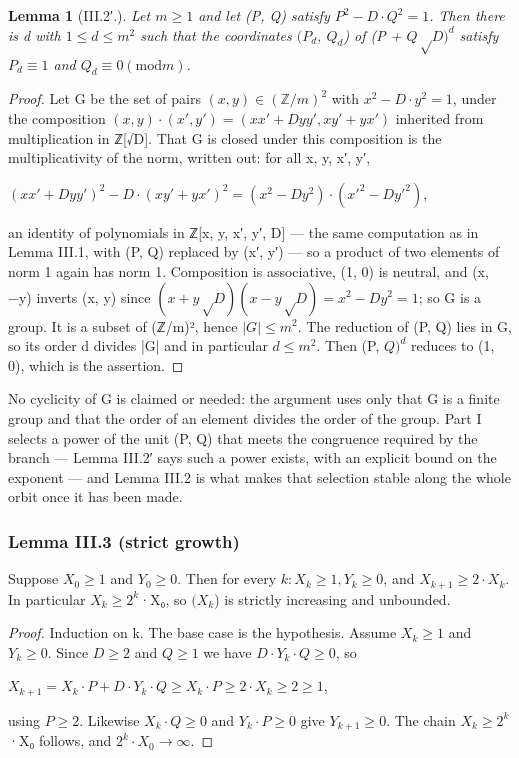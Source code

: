 \documentclass[11pt]{article}
\theoremstyle{plain}
\theoremstyle{definition}
\theoremstyle{remark}
\theoremstyle{plain}
\newtheorem*{lemma*}{Lemma}
\theoremstyle{definition}
\theoremstyle{remark}
\newcounter{Part}
\theoremstyle{plain}
\theoremstyle{definition}
\theoremstyle{remark}
\begin{document}
\begin{lemma*}[III.2′.]
Let $m ≥ 1$ and let (P, Q) satisfy $P^{2} − D·Q^{2} = 1$. Then there is d with $1 ≤ d ≤ m^{2}$ such that the coordinates $(P_{d}$, $Q_{d}$) of (P + $Q√D)^{d}$ satisfy $P_{d} ≡ 1$ and $Q_{d} ≡ 0 (\mathrm{mod} m)$.

\end{lemma*}
\begin{proof}
Let G be the set of pairs $(x, y) ∈ (ℤ/m)^{2}$ with $x^{2} − D·y^{2} = 1$, under the composition $(x, y)·(x′, y′) = (x x′ + D y y′, x y′ + y x′)$ inherited from multiplication in ℤ[√D]. That G is closed under this composition is the multiplicativity of the norm, written out: for all x, y, x′, y′,

$(x x′ + D y y′)^{2} − D·(x y′ + y x′)^{2} = (x^{2} − D y^{2})·(x′^{2} − D y′^{2})$,

an identity of polynomials in ℤ[x, y, x′, y′, D] — the same computation as in Lemma III.1, with (P, Q) replaced by (x′, y′) — so a product of two elements of norm 1 again has norm 1. Composition is associative, (1, 0) is neutral, and (x, −y) inverts (x, y) since $(x + y√D)(x − y√D) = x^{2} − D y^{2} = 1$; so G is a group. It is a subset of (ℤ/m)², hence $|G| ≤ m^{2}$. The reduction of (P, Q) lies in G, so its order d divides |G| and in particular $d ≤ m^{2}$. Then (P, $Q)^{d}$ reduces to (1, 0), which is the assertion.

\end{proof}
No cyclicity of G is claimed or needed: the argument uses only that G is a finite group and that the order of an element divides the order of the group. Part I selects a power of the unit (P, Q) that meets the congruence required by the branch — Lemma III.2′ says such a power exists, with an explicit bound on the exponent — and Lemma III.2 is what makes that selection stable along the whole orbit once it has been made.

\subsubsection*{Lemma III.3 (strict growth)}
Suppose $X_{0} ≥ 1$ and $Y_{0} ≥ 0$. Then for every $k: X_{k} ≥ 1, Y_{k} ≥ 0$, and $X_{k+1} ≥ 2·X_{k}$. In particular $X_{k} ≥ 2^{k}$·X₀, so $(X_{k}$) is strictly increasing and unbounded.

\begin{proof}
Induction on k. The base case is the hypothesis. Assume $X_{k} ≥ 1$ and $Y_{k} ≥ 0$. Since $D ≥ 2$ and $Q ≥ 1$ we have $D·Y_{k}·Q ≥ 0$, so

$X_{k+1} = X_{k}·P + D·Y_{k}·Q ≥ X_{k}·P ≥ 2·X_{k} ≥ 2 ≥ 1$,

using $P ≥ 2$. Likewise $X_{k}·Q ≥ 0$ and $Y_{k}·P ≥ 0$ give $Y_{k+1} ≥ 0$. The chain $X_{k} ≥ 2^{k}$·X₀ follows, and $2^{k}·X_{0} → ∞$.

\end{proof}
\end{document}
